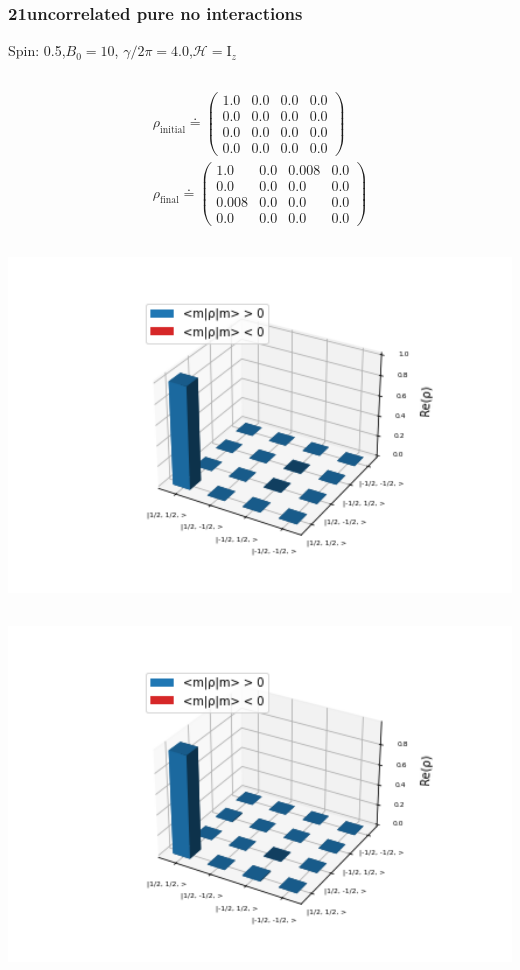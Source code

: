\documentclass[10pt]{beamer}
\begin{document}
\begin{frame}
\frametitle{21uncorrelated pure no interactions}
Spin: 0.5,$B_0= 10$, $\gamma/2\pi = 4.0$,$\mathcal{H}=\text{I}_{z}$
\begin{columns}[T]
\begin{column}{.5\textwidth}
\begin{align*}
\rho_{\text{initial}}\doteq
\begin{pmatrix}
1.0 & 0.0 & 0.0 & 0.0 \\
0.0 & 0.0 & 0.0 & 0.0 \\
0.0 & 0.0 & 0.0 & 0.0 \\
0.0 & 0.0 & 0.0 & 0.0
\end{pmatrix}
\\
\rho_{\text{final}}\doteq
\begin{pmatrix}
1.0 & 0.0 & 0.008 & 0.0 \\
0.0 & 0.0 & 0.0 & 0.0 \\
0.008 & 0.0 & 0.0 & 0.0 \\
0.0 & 0.0 & 0.0 & 0.0
\end{pmatrix}
\end{align*}
\begin{column}{.5\textwidth}
\includegraphics[width=1.5\textwidth]{./spin1-2/21uncorrelated_pure_no_interactions/InitialRealPartDensityMatrix.png}
\end{column}
\begin{column}{.5\textwidth}
\includegraphics[width=1.5\textwidth]{./spin1-2/21uncorrelated_pure_no_interactions/EvolvedRealPartDensityMatrix.png}

\end{column}
\end{column}
\end{columns}
\end{frame}
\end{document}
